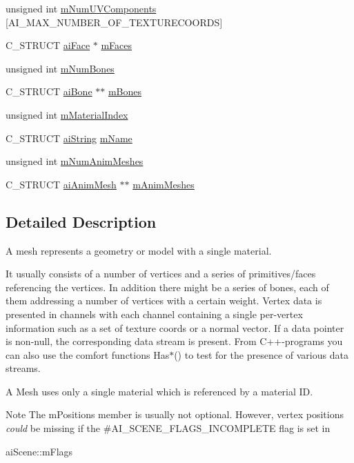 \begin{DoxyCompactItemize}
\item 
unsigned int \hyperlink{structai_mesh_a635c631a6e66d32989d6b25b2a892d86}{m\+Num\+U\+V\+Components} \mbox{[}A\+I\+\_\+\+M\+A\+X\+\_\+\+N\+U\+M\+B\+E\+R\+\_\+\+O\+F\+\_\+\+T\+E\+X\+T\+U\+R\+E\+C\+O\+O\+R\+DS\mbox{]}
\item 
C\+\_\+\+S\+T\+R\+U\+CT \hyperlink{structai_face}{ai\+Face} $\ast$ \hyperlink{structai_mesh_a5a65fbc7fdea7f8d36f39047425ece07}{m\+Faces}
\item 
unsigned int \hyperlink{structai_mesh_a0f9d5425b6300e32a842a94f943fd79e}{m\+Num\+Bones}
\item 
C\+\_\+\+S\+T\+R\+U\+CT \hyperlink{structai_bone}{ai\+Bone} $\ast$$\ast$ \hyperlink{structai_mesh_a0c0582a7f45b340b6a33552c53232539}{m\+Bones}
\item 
unsigned int \hyperlink{structai_mesh_aa2807c7ba172115203ed16047ad65f9e}{m\+Material\+Index}
\item 
C\+\_\+\+S\+T\+R\+U\+CT \hyperlink{structai_string}{ai\+String} \hyperlink{structai_mesh_a8dd9433e0c5b008e3e5aee6c801d3b74}{m\+Name}
\item 
unsigned int \hyperlink{structai_mesh_a1692a300222b32348ae51779df4a697e}{m\+Num\+Anim\+Meshes}
\item 
C\+\_\+\+S\+T\+R\+U\+CT \hyperlink{structai_anim_mesh}{ai\+Anim\+Mesh} $\ast$$\ast$ \hyperlink{structai_mesh_a5078f7db7e99ed05db89dfa412f0e990}{m\+Anim\+Meshes}
\end{DoxyCompactItemize}


\subsection{Detailed Description}
A mesh represents a geometry or model with a single material. 

It usually consists of a number of vertices and a series of primitives/faces referencing the vertices. In addition there might be a series of bones, each of them addressing a number of vertices with a certain weight. Vertex data is presented in channels with each channel containing a single per-\/vertex information such as a set of texture coords or a normal vector. If a data pointer is non-\/null, the corresponding data stream is present. From C++-\/programs you can also use the comfort functions Has$\ast$() to test for the presence of various data streams.

A Mesh uses only a single material which is referenced by a material ID. \begin{DoxyNote}{Note}
The m\+Positions member is usually not optional. However, vertex positions {\itshape could} be missing if the \#\+A\+I\+\_\+\+S\+C\+E\+N\+E\+\_\+\+F\+L\+A\+G\+S\+\_\+\+I\+N\+C\+O\+M\+P\+L\+E\+TE flag is set in 
\begin{DoxyCode}
aiScene::mFlags
\end{DoxyCode}
 
\end{DoxyNote}


